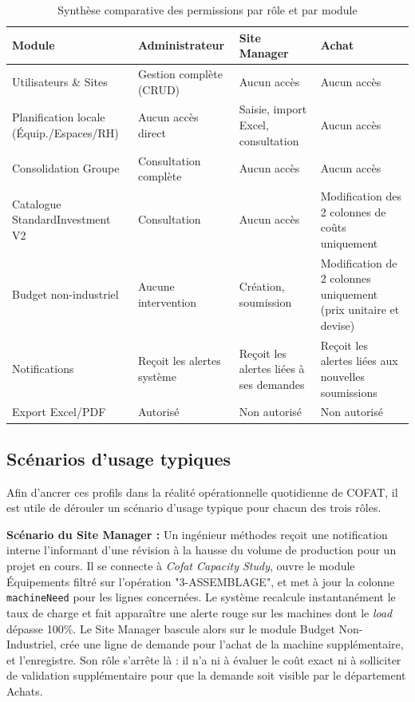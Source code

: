 \begin{table}[h]
\centering
\begin{tabular}{|p{3.4cm}|p{3.4cm}|p{3.4cm}|p{3.4cm}|}
\hline
\textbf{Module} & \textbf{Administrateur} & \textbf{Site Manager} & \textbf{Achat} \\ \hline
Utilisateurs \& Sites & Gestion complète (CRUD) & Aucun accès & Aucun accès \\ \hline
Planification locale (Équip./Espaces/RH) & Aucun accès direct & Saisie, import Excel, consultation & Aucun accès \\ \hline
Consolidation Groupe & Consultation complète & Aucun accès & Aucun accès \\ \hline
Catalogue StandardInvestment V2 & Consultation & Aucun accès & Modification des 2 colonnes de coûts uniquement \\ \hline
Budget non-industriel & Aucune intervention & Création, soumission & Modification de 2 colonnes uniquement (prix unitaire et devise) \\ \hline
Notifications & Reçoit les alertes système & Reçoit les alertes liées à ses demandes & Reçoit les alertes liées aux nouvelles soumissions \\ \hline
Export Excel/PDF & Autorisé & Non autorisé & Non autorisé \\ \hline
\end{tabular}
\caption{Synthèse comparative des permissions par rôle et par module}
\label{tab:synthese_roles}
\end{table}



\subsection{Scénarios d'usage typiques}
Afin d'ancrer ces profils dans la réalité opérationnelle quotidienne de COFAT, il est utile de dérouler un scénario d'usage typique pour chacun des trois rôles.

\textbf{Scénario du Site Manager :} Un ingénieur méthodes reçoit une notification interne l'informant d'une révision à la hausse du volume de production pour un projet en cours. Il se connecte à \textit{Cofat Capacity Study}, ouvre le module Équipements filtré sur l'opération "3-ASSEMBLAGE", et met à jour la colonne \texttt{machineNeed} pour les lignes concernées. Le système recalcule instantanément le taux de charge et fait apparaître une alerte rouge sur les machines dont le \textit{load} dépasse 100\%. Le Site Manager bascule alors sur le module Budget Non-Industriel, crée une ligne de demande pour l'achat de la machine supplémentaire, et l'enregistre. Son rôle s'arrête là : il n'a ni à évaluer le coût exact ni à solliciter de validation supplémentaire pour que la demande soit visible par le département Achats.

